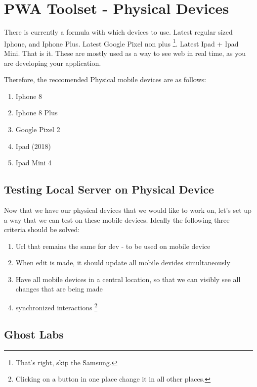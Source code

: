 \maketitle{}
\section{ PWA Toolset - Physical Devices }

There is currently a formula with which devices to use. Latest regular sized
Iphone, and Iphone Plus. Latest Google Pixel non plus
\footnote{That's right, skip the Samsung.}. Latest Ipad + Ipad Mini. That
is it. These are mostly used as a way to see web in real time, as you are
developing your application.

Therefore, the reccomended Physical mobile devices are as follows:
\begin{enumerate}
  \item Iphone 8
  \item Iphone 8 Plus
  \item Google Pixel 2
  \item Ipad (2018)
  \item Ipad Mini 4
\end{enumerate}

\subsection{ Testing Local Server on Physical Device }

Now that we have our physical devices that we would like to work on, let's set
up a way that we can test on these mobile devices. Ideally the following three
criteria should be solved:
\begin{enumerate}
  \item Url that remains the same for dev - to be used on mobile device
  \item When edit is made, it should update all mobile devides simultaneously
  \item Have all mobile devices in a central location, so that we can visibly
  see all changes that are being made
  \item synchronized interactions \footnote{Clicking on a button in one place
  change it in all other places.}
\end{enumerate}

\subsection{ Ghost Labs }

